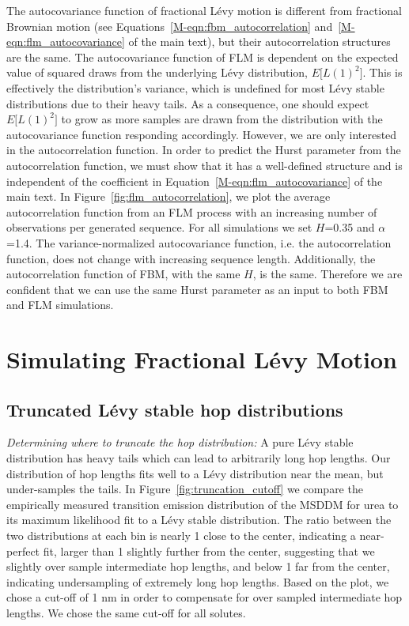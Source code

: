 \documentclass{article}
\begin{document}
  The autocovariance function of fractional L\'evy motion is different from fractional
  Brownian motion (see Equations~\ref{M-eqn:fbm_autocorrelation}
  and~\ref{M-eqn:flm_autocovariance} of the main text), but their autocorrelation 
  structures are the same. The autocovariance function of FLM is dependent on the 
  expected value of squared draws from the underlying L\'evy distribution, $E\big[L(1)^2\big]$. 
  This is effectively the distribution's variance, which is undefined for most 
  L\'evy stable distributions due to their heavy tails. As a consequence, one should 
  expect $E\big[L(1)^2\big]$ to grow as more samples are drawn from the distribution
  with the autocovariance function responding accordingly. 
  However, we are only interested in the autocorrelation function. In order to predict
  the Hurst parameter from the autocorrelation function, we must show that it has 
  a well-defined structure and is independent of the coefficient in 
  Equation~\ref{M-eqn:flm_autocovariance} of the main text. In Figure~\ref{fig:flm_autocorrelation}, 
  we plot the average autocorrelation function from an FLM process with an increasing 
  number of observations per generated sequence. For all simulations we set $H$=0.35 
  and $\alpha$=1.4. The variance-normalized autocovariance function, i.e. the autocorrelation
  function, does not change with increasing sequence length. Additionally, the
  autocorrelation function of FBM, with the same $H$, is the same. Therefore we are 
  confident that we can use the same Hurst parameter as an input to both FBM and FLM
  simulations.
  
  \newpage
  
  \section{Simulating Fractional L\'evy Motion}\label{section:sFLM}
  
  \subsection{Truncated L\'evy stable hop distributions}\label{section:truncation}
  
  \textit{Determining where to truncate the hop distribution:} A pure
  L\'evy stable distribution has heavy tails which can lead to arbitrarily
  long hop lengths. Our distribution of hop lengths fits well to a L\'evy
  distribution near the mean, but under-samples the tails. In 
  Figure~\ref{fig:truncation_cutoff} we compare the empirically 
  measured transition emission distribution of the MSDDM for urea to its maximum likelihood fit to
  a L\'evy stable distribution. The ratio between the two distributions 
  at each bin is nearly 1 close to the center, indicating a near-perfect
  fit, larger than 1 slightly further from the center, suggesting that 
  we slightly over sample intermediate hop lengths, and below 1 far from 
  the center, indicating undersampling of extremely long hop lengths.
  Based on the plot, we chose a cut-off of 1 nm in order to compensate for
  over sampled intermediate hop lengths. We chose the same cut-off for all
  solutes.
  
\end{document}
